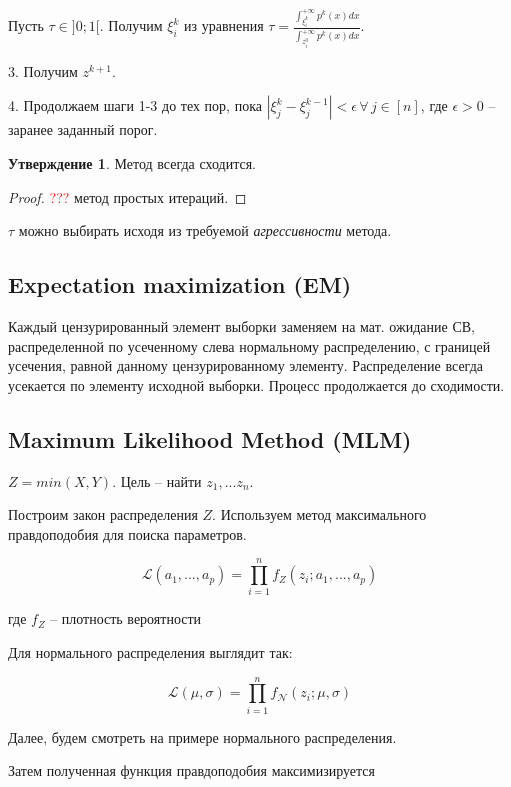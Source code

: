 \documentclass[12pt, reqno]{article}
\theoremstyle{definition}
\theoremstyle{definition}
\theoremstyle{definition}
\theoremstyle{definition}
\theoremstyle{definition}
\theoremstyle{definition}
\theoremstyle{definition}
\theoremstyle{definition}
\theoremstyle{definition}
\newtheorem{state}{Утверждение}[section]
\begin{document}
		Пусть $\tau \in ]0; 1[$. Получим $\xi_i^{k}$ из уравнения $\tau = \frac{\int_{\xi^{k}_i}^{+\infty} p^{k}(x) dx}{\int_{z_i^0}^{+\infty} p^{k}(x) dx}$.
		
		3. Получим $z^{k + 1}$.
		
		4. Продолжаем шаги 1-3 до тех пор, пока $|\xi^k_j - \xi^{k - 1}_j| < \epsilon \, \forall \, j \in [n]$, где $\epsilon > 0$ -- заранее заданный порог.
		
		\begin{state}
			Метод всегда сходится.
		\end{state}
		\begin{proof}
			\textcolor{red}{???} метод простых итераций.
		\end{proof}
		
		$\tau$ можно выбирать исходя из требуемой \textit{агрессивности} метода.
		
		\subsection{Expectation maximization (EM)}
		
		Каждый цензурированный элемент выборки заменяем на мат. ожидание СВ, распределенной по усеченному слева нормальному распределению, с границей усечения, равной данному цензурированному элементу. Распределение всегда усекается по элементу исходной выборки. Процесс продолжается до сходимости.
		
		\subsection{Maximum Likelihood Method (MLM)}
		
		$Z = min(X, Y)$. Цель -- найти $z_1, ... z_n$.
		
		Построим закон распределения $Z$. Используем метод максимального правдоподобия для поиска параметров.
		
		$$\mathcal{L}(a_1, ..., a_p) = \prod^n_{i = 1} f_Z(z_i; a_1, ... , a_p)$$
			
		где $f_Z$ -- плотность вероятности
		
		Для нормального распределения выглядит так:
		
		$$\mathcal{L}(\mu, \sigma) = \prod^n_{i = 1} f_\mathcal{N}(z_i; \mu, \sigma)$$
		
		Далее, будем смотреть на примере нормального распределения.
		
		Затем полученная функция правдоподобия максимизируется
		
\end{document}
